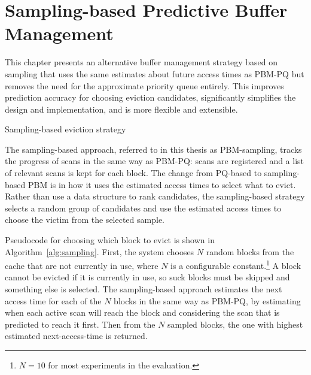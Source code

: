 
\chapter{Sampling-based Predictive Buffer Management}
\label{sec:PBM-sampling}

This chapter presents an alternative buffer management strategy based on sampling that uses the same estimates about future access times as PBM-PQ but removes the need for the approximate priority queue entirely. This improves prediction accuracy for choosing eviction candidates, significantly simplifies the design and implementation, and is more flexible and extensible.

\begin{algorithm}
\SetAlgoLined
\DontPrintSemicolon
{}

\;

\;
\caption{Sampling-based eviction strategy}
\label{alg:sampling}
\end{algorithm}

The sampling-based approach, referred to in this thesis as PBM-sampling, tracks the progress of scans in the same way as PBM-PQ: scans are registered and a list of relevant scans is kept for each block. The change from PQ-based to sampling-based PBM is in how it uses the estimated access times to select what to evict. Rather than use a data structure to rank candidates, the sampling-based strategy selects a random group of candidates and use the estimated access times to choose the victim from the selected sample.

Pseudocode for choosing which block to evict is shown in Algorithm~\ref{alg:sampling}. First, the system chooses $N$ random blocks from the cache that are not currently in use, where $N$ is a configurable constant.\footnote{$N=10$ for most experiments in the evaluation.} A block cannot be evicted if it is currently in use, so suck blocks must be skipped and something else is selected. The sampling-based approach estimates the next access time for each of the $N$ blocks in the same way as PBM-PQ, by estimating when each active scan will reach the block and considering the scan that is predicted to reach it first. Then from the $N$ sampled blocks, the one with highest estimated next-access-time is returned.

